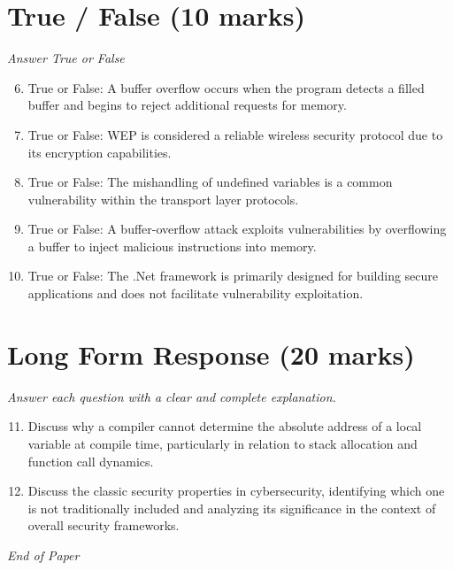 \documentclass[12pt]{article}
\begin{document}
\section*{True / False (10 marks)}
\textit{Answer True or False}
\begin{enumerate}[label=\arabic*.]
\setcounter{enumi}{5}
\item True or False: A buffer overflow occurs when the program detects a filled buffer and begins to reject additional requests for memory.
\item True or False: WEP is considered a reliable wireless security protocol due to its encryption capabilities.
\item True or False: The mishandling of undefined variables is a common vulnerability within the transport layer protocols.
\item True or False: A buffer-overflow attack exploits vulnerabilities by overflowing a buffer to inject malicious instructions into memory.
\item True or False: The .Net framework is primarily designed for building secure applications and does not facilitate vulnerability exploitation.
\end{enumerate}

\section*{Long Form Response (20 marks)}
\textit{Answer each question with a clear and complete explanation.}
\begin{enumerate}[label=\arabic*.]
\setcounter{enumi}{10}
\item Discuss why a compiler cannot determine the absolute address of a local variable at compile time, particularly in relation to stack allocation and function call dynamics.
\item Discuss the classic security properties in cybersecurity, identifying which one is not traditionally included and analyzing its significance in the context of overall security frameworks.
\end{enumerate}

\vfill
\noindent\textit{End of Paper}
\end{document}
